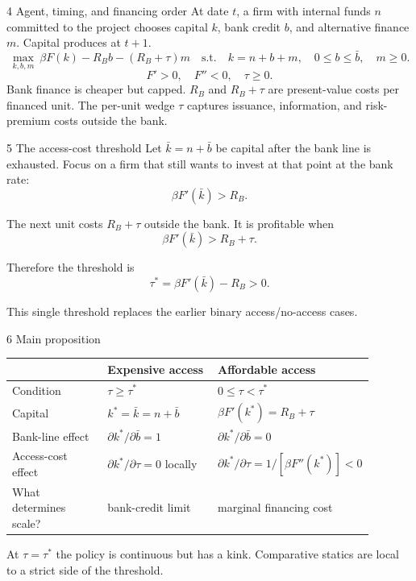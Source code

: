 \documentclass[aspectratio=169,11pt]{beamer}
\newcommand{\Rb}{R_B}
\begin{document}
\begin{frame}{4 \textperiodcentered{} Agent, timing, and financing order}
At date $t$, a firm with internal funds $n$ committed to the project chooses
capital $k$, bank credit $b$, and alternative finance $m$. Capital produces at
$t+1$.
\[
\max_{k,b,m}\ \beta F(k)-\Rb b-(\Rb+\tau)m
\quad\text{s.t.}\quad
k=n+b+m,\quad 0\le b\le\bar b,\quad m\ge0.
\]
\[
 F'>0,\quad F''<0,\quad \tau\ge0.
\]
Bank finance is cheaper but capped. $\Rb$ and $\Rb+\tau$ are present-value
costs per financed unit. The per-unit wedge $\tau$ captures issuance,
information, and risk-premium costs outside the bank.
\end{frame}

\begin{frame}{5 \textperiodcentered{} The access-cost threshold}
Let $\bar k=n+\bar b$ be capital after the bank line is exhausted. Focus on a
firm that still wants to invest at that point at the bank rate:
\[
\beta F'(\bar k)>\Rb.
\]

The next unit costs $\Rb+\tau$ outside the bank. It is profitable when
\[
\beta F'(\bar k)>\Rb+\tau.
\]

Therefore the threshold is
\[
\boxed{\tau^*=\beta F'(\bar k)-\Rb>0.}
\]

This single threshold replaces the earlier binary access/no-access cases.
\end{frame}

\begin{frame}{6 \textperiodcentered{} Main proposition}
\small
\begin{tabular}{p{0.27\linewidth}p{0.31\linewidth}p{0.31\linewidth}}
\toprule
 & Expensive access & Affordable access \\
\midrule
Condition & $\tau\ge\tau^*$ & $0\le\tau<\tau^*$ \\
Capital & $k^*=\bar k=n+\bar b$ & $\beta F'(k^*)=\Rb+\tau$ \\
Bank-line effect & $\partial k^*/\partial\bar b=1$ & $\partial k^*/\partial\bar b=0$ \\
Access-cost effect & $\partial k^*/\partial\tau=0$ locally &
 $\partial k^*/\partial\tau=1/[\beta F''(k^*)]<0$ \\
What determines scale? & bank-credit limit & marginal financing cost \\
\bottomrule
\end{tabular}

\medskip
At $\tau=\tau^*$ the policy is continuous but has a kink. Comparative statics
are local to a strict side of the threshold.
\end{frame}
\end{document}
